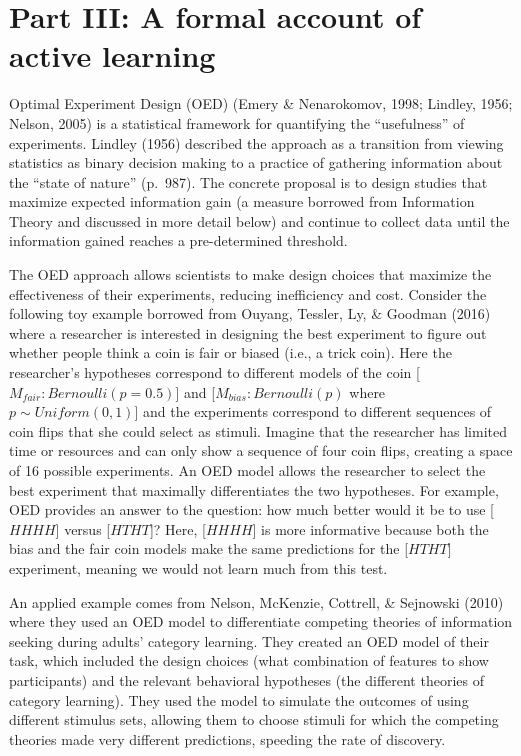 \documentclass[oneside]{report}
\begin{document}
\hypertarget{p3}{%
\section{Part III: A formal account of active learning}\label{p3}}

Optimal Experiment Design (OED) (Emery \& Nenarokomov, 1998; Lindley,
1956; Nelson, 2005) is a statistical framework for quantifying the
``usefulness'' of experiments. Lindley (1956) described the approach as
a transition from viewing statistics as binary decision making to a
practice of gathering information about the ``state of nature''
(p.~987). The concrete proposal is to design studies that maximize
expected information gain (a measure borrowed from Information Theory
and discussed in more detail below) and continue to collect data until
the information gained reaches a pre-determined threshold.

The OED approach allows scientists to make design choices that maximize
the effectiveness of their experiments, reducing inefficiency and cost.
Consider the following toy example borrowed from Ouyang, Tessler, Ly, \&
Goodman (2016) where a researcher is interested in designing the best
experiment to figure out whether people think a coin is fair or biased
(i.e., a trick coin). Here the researcher's hypotheses correspond to
different models of the coin {[}\(M_{fair}: Bernoulli(p = 0.5)\){]} and
{[}\(M_{bias}: Bernoulli(p)\) where \(p \sim Uniform(0,1)\){]} and the
experiments correspond to different sequences of coin flips that she
could select as stimuli. Imagine that the researcher has limited time or
resources and can only show a sequence of four coin flips, creating a
space of 16 possible experiments. An OED model allows the researcher to
select the best experiment that maximally differentiates the two
hypotheses. For example, OED provides an answer to the question: how
much better would it be to use {[}\(HHHH\){]} versus {[}\(HTHT\){]}?
Here, {[}\(HHHH\){]} is more informative because both the bias and the
fair coin models make the same predictions for the {[}\(HTHT\){]}
experiment, meaning we would not learn much from this test.

An applied example comes from Nelson, McKenzie, Cottrell, \& Sejnowski
(2010) where they used an OED model to differentiate competing theories
of information seeking during adults' category learning. They created an
OED model of their task, which included the design choices (what
combination of features to show participants) and the relevant
behavioral hypotheses (the different theories of category learning).
They used the model to simulate the outcomes of using different stimulus
sets, allowing them to choose stimuli for which the competing theories
made very different predictions, speeding the rate of discovery.
\end{document}
